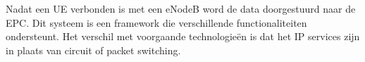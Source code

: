 Nadat een UE verbonden is met een eNodeB word de data doorgestuurd naar de EPC. Dit systeem is een framework die verschillende functionaliteiten ondersteunt. Het verschil met voorgaande technologieën is dat het IP services zijn in plaats van circuit of packet switching. \autocite{Awati2024}







